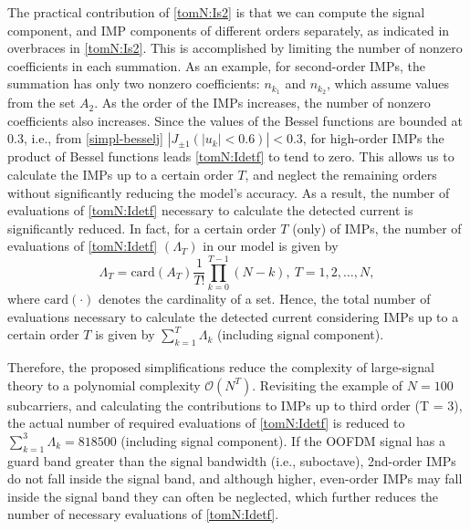 \documentclass[journal]{IEEEtran}
\begin{document}
The practical contribution of \eqref{tomN:Is2} is that we can compute the signal component, and IMP components of different orders separately, as indicated in overbraces in \eqref{tomN:Is2}. This is accomplished by limiting the number of nonzero coefficients in each summation. As an example, for second-order IMPs, the summation has only two nonzero coefficients: $n_{k_1}$ and $n_{k_2}$, which assume values from the set $A_2$. As the order of the IMPs increases, the number of nonzero coefficients also increases. Since the values of the Bessel functions are bounded at 0.3, i.e., from \eqref{simpl-besselj} $|J_{\pm 1}(|u_k| < 0.6)| < 0.3$, for high-order IMPs the product of Bessel functions leads \eqref{tomN:Idetf} to tend to zero. This allows us to calculate the IMPs up to a certain order $T$, and neglect the remaining orders without significantly reducing the model's accuracy. As a result, the number of evaluations of \eqref{tomN:Idetf} necessary to calculate the detected current is significantly reduced. In fact, for a certain order $T$ (only) of IMPs, the number of evaluations of \eqref{tomN:Idetf} $(\Lambda_T)$ in our model is given by
\setcounter{equation}{6}
\begin{equation}\label{its}
\Lambda_T = \mathrm{card}(A_T)\frac{1}{T!}\prod_{k = 0}^{T-1} (N - k),~T = 1,2,\ldots,N,
\end{equation}
where $\mathrm{card}(\cdot)$ denotes the cardinality of a set. Hence, the total number of evaluations necessary to calculate the detected current considering IMPs up to a certain order $T$ is given by $\sum_{k = 1}^T \Lambda_k$ (including signal component).

Therefore, the proposed simplifications reduce the complexity of large-signal theory to a polynomial complexity $\mathcal{O}(N^{T})$. Revisiting the example of $N = 100$ subcarriers, and calculating the contributions to IMPs up to third order (T = 3), the actual number of required evaluations of \eqref{tomN:Idetf} is reduced to $\sum_{k = 1}^3 \Lambda_k = 818500$ (including signal component). If the OOFDM signal has a guard band greater than the signal bandwidth (i.e., suboctave), 2nd-order IMPs do not fall inside the signal band, and although higher, even-order IMPs may fall inside the signal band they can often be neglected, which further reduces the number of necessary evaluations of \eqref{tomN:Idetf}.
\end{document}
